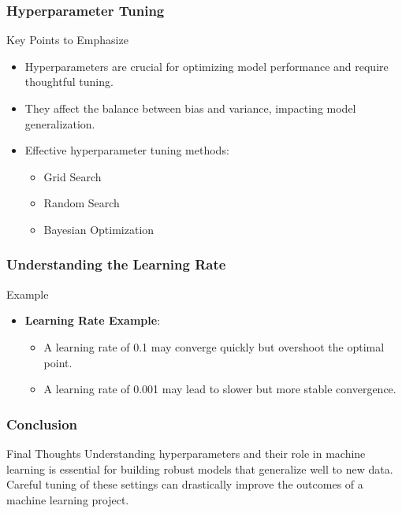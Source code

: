 \documentclass[aspectratio=169]{beamer}
\begin{document}
\begin{frame}[fragile]
    \frametitle{Hyperparameter Tuning}
    \begin{block}{Key Points to Emphasize}
        \begin{itemize}
            \item Hyperparameters are crucial for optimizing model performance and require thoughtful tuning.
            \item They affect the balance between bias and variance, impacting model generalization.
            \item Effective hyperparameter tuning methods:
            \begin{itemize}
                \item Grid Search
                \item Random Search
                \item Bayesian Optimization
            \end{itemize}
        \end{itemize}
    \end{block}
\end{frame}

\begin{frame}[fragile]
    \frametitle{Understanding the Learning Rate}
    \begin{block}{Example}
        \begin{itemize}
            \item \textbf{Learning Rate Example}: 
            \begin{itemize}
                \item A learning rate of 0.1 may converge quickly but overshoot the optimal point.
                \item A learning rate of 0.001 may lead to slower but more stable convergence.
            \end{itemize}
        \end{itemize}
    \end{block}
\end{frame}

\begin{frame}[fragile]
    \frametitle{Conclusion}
    \begin{block}{Final Thoughts}
        Understanding hyperparameters and their role in machine learning is essential for building robust models that generalize well to new data. 
        Careful tuning of these settings can drastically improve the outcomes of a machine learning project.
    \end{block}
\end{frame}
\end{document}

